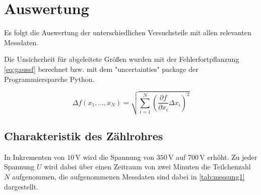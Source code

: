 \section{Auswertung}
\label{sec:auswertung}

Es folgt die Auswertung der unterschiedlichen
Versuchsteile mit allen relevanten Messdaten.

Die Unsicherheit für abgeleitete Größen wurden mit der Fehlerfortpflanzung \eqref{eq:gaussf} berechnet bzw. mit dem "uncertainties" package der Programmiersparche Python.

\begin{equation}
Δf(x_1,...,x_N)=\sqrt{\sum_{i=1}^N (\frac{\partial f}{\partial x_i}Δx_i)^2}
\label{eq:gaussF}
\end{equation}


\subsection{Charakteristik des Zählrohres}
\label{subsec:charakteristik}

In Inkrementen von $10 \,\unit{\volt}$ wird die Spannung von $350 \,\unit{\volt}$ auf $700 \,\unit{\volt}$ erhöht.
Zu jeder Spannung $U$ wird dabei über einen Zeitraum von zwei Minuten die Teilchenzahl $N$ aufgenommen, die aufgenommenen Messdaten sind dabei in \autoref{tab:messung1} dargestellt.

